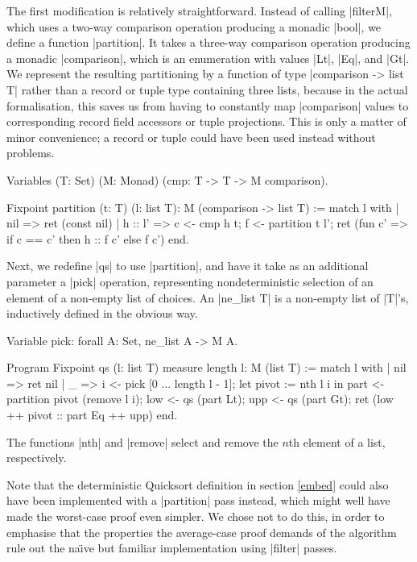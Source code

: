 \documentclass[runningheads]{llncs}
\begin{document}
The first modification is relatively straightforward. Instead of calling
|filterM|, which uses a two-way comparison operation producing a monadic |bool|, we
define a function |partition|. It takes a three-way comparison operation producing a monadic |comparison|, which is an enumeration with values |Lt|, |Eq|, and |Gt|. We represent the resulting partitioning by a function of type |comparison -> list T| rather than a record or tuple type containing three lists, because in the actual formalisation, this saves us from having to constantly map |comparison| values to corresponding record field accessors or tuple projections. This is only a matter of minor convenience; a record or tuple could have been used instead without problems.

\begin{code}
  Variables (T: Set) (M: Monad) (cmp: T -> T -> M comparison).

  Fixpoint partition (t: T) (l: list T): M (comparison -> list T) :=
    match l with
    | nil => ret (const nil)
    | h :: l' =>
        c <- cmp h t; f <- partition t l';
        ret (fun c' => if c == c' then h :: f c' else f c')
    end.
\end{code}

Next, we redefine |qs| to use |partition|, and have it take as an additional parameter a |pick| operation, representing nondeterministic selection of an element of a non-empty list of choices. An |ne_list T| is a non-empty list of |T|'s, inductively defined in the obvious way. 

\begin{code}
  Variable pick: forall A: Set, ne_list A -> M A.

  Program Fixpoint qs (l: list T) {measure length l}: M (list T) :=
    match l with
    | nil => ret nil
    | _ =>
        i <- pick [0 ... length l - 1];
        let pivot := nth l i in
        part <- partition pivot (remove l i);
        low <- qs (part Lt);
        upp <- qs (part Gt);
        ret (low ++ pivot :: part Eq ++ upp)
    end.
\end{code}
The functions |nth| and |remove| select and remove the $n$th element of a list, respectively.

Note that the deterministic Quicksort definition in section \ref{embed} could also have been implemented with a |partition| pass instead, which might well have made the worst-case proof even simpler. We chose not to do this, in order to emphasise that the properties the average-case proof demands of the algorithm rule out the na{\"\i}ve but familiar implementation using |filter| passes.
\end{document}
